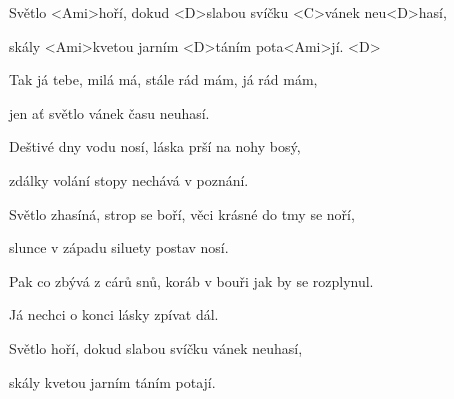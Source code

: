 

\zs
Světlo <Ami>hoří, dokud <D>slabou svíčku <C>vánek neu<D>hasí,

skály <Ami>kvetou jarním <D>táním pota<Ami>jí. <D>

Tak já tebe, milá má, stále rád mám, já rád mám,

jen ať světlo vánek času neuhasí.
\ks

\zr
Deštivé dny vodu nosí, láska prší na nohy bosý,

zdálky volání stopy nechává v poznání.

Světlo zhasíná, strop se boří, věci krásné do tmy se noří,

slunce v západu siluety postav nosí.
\kr

\zs
Pak co zbývá z cárů snů, koráb v bouři jak by se rozplynul.

Já nechci o konci lásky zpívat dál.

Světlo hoří, dokud slabou svíčku vánek neuhasí,

skály kvetou jarním táním potají.
\ks

\zr\kr

\kp
